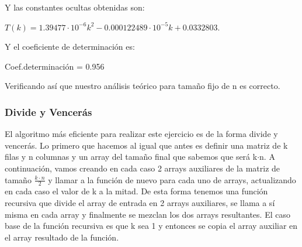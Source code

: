 \documentclass[10pt,a4paper]{article}
\begin{document}
\begin{enumerate}
	Y las constantes ocultas obtenidas son:
	
	\( T(k) = 1.39477\cdot 10^{-6} k^2 - 0.000122489\cdot 10^{-5}k + 0.0332803\).
	
	Y el coeficiente de determinación es:
	
	Coef.determinación = 0.956
	
	Verificando así que nuestro análisis teórico para tamaño fijo de n es correcto.

 \end{enumerate}
\subsubsection{Divide y Vencerás}
El algoritmo más eficiente para realizar este ejercicio es de la forma divide y vencerás. Lo primero que hacemos al igual que antes es definir una matriz de k filas y n columnas y un array del tamaño final que sabemos que será k$\cdot$n. A continuación, vamos creando en cada caso 2 arrays auxiliares de la matriz de tamaño $ \frac{k\cdot n}{2} $ y llamar a la función de nuevo para cada uno de arrays, actualizando en cada caso el valor de k a la mitad. De esta forma tenemos una función recursiva que divide el array de entrada en 2 arrays auxiliares, se llama a sí misma en cada array y finalmente se mezclan los dos arrays resultantes. El caso base de la función recursiva es que k sea 1 y entonces se copia el array auxiliar en el array resultado de la función.
\\
\end{document}
